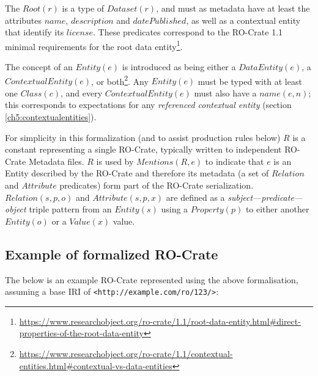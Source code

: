 The $Root(r)$ is a type of $Dataset(r)$, and must as metadata have at least the attributes $name$, $description$ and $datePublished$, as well as a contextual entity that identify its $license$. These predicates correspond to the RO-Crate 1.1 minimal requirements for the root data entity\footnote{
    \url{https://www.researchobject.org/ro-crate/1.1/root-data-entity.html\#direct-properties-of-the-root-data-entity}
}.

The concept of an $Entity(e)$ is introduced as being either a $DataEntity(e)$, a $ContextualEntity(e)$, or both\footnote{
    \url{https://www.researchobject.org/ro-crate/1.1/contextual-entities.html\#contextual-vs-data-entities}
}. Any $Entity(e)$ must be typed with at least one $Class(c)$, and every $ContextualEntity(e)$ must also have a $name(e,n)$; this corresponds to expectations for any \emph{referenced contextual entity} (section \vref{ch5:contextualentities}). 

For simplicity in this formalization (and to assist production rules below) $R$ is a constant representing a single RO-Crate, typically written to independent RO-Crate Metadata files. $R$ is used by $Mentions(R, e)$ to indicate that $e$ is an Entity described by the RO-Crate and therefore its metadata (a set of $Relation$ and $Attribute$ predicates) form part of the RO-Crate serialization. $Relation(s, p, o)$ and $Attribute(s, p, x)$ are defined as a \emph{subject—predicate—object} triple pattern from an $Entity(s)$ using a $Property(p)$ to either another $Entity(o)$ or a $Value(x)$ value.

\subsection{Example of formalized RO-Crate}

The below is an example RO-Crate represented using the above formalisation, assuming a base IRI of \texttt{<http://example.com/ro/123/>}:

